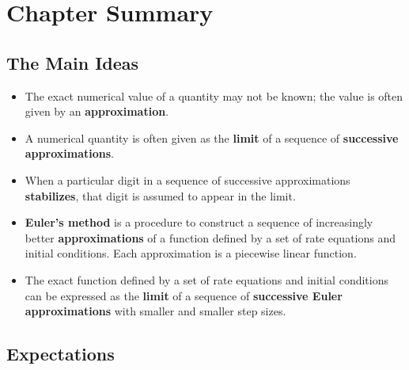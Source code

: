 \section{Chapter Summary}
\label{sec:chapter-summary}

\subsection{The Main Ideas}
\label{subsec:the-main-ideas}

\begin{itemize}

\item The exact numerical value of a quantity may not be known; the
 value is often given by an {\bf approximation}.

\item A numerical quantity is often given as the {\bf limit} of a
 sequence of {\bf successive approximations}.

\item When a particular digit in a sequence of successive
 approximations {\bf stabilizes}, that digit is assumed to appear in
 the limit.

\item {\bf Euler's method} is a procedure to construct a sequence of
 increasingly better {\bf approximations} of a function defined by a
 set of rate equations and initial conditions.  Each approximation is
 a piecewise linear function.

\item The exact function defined by a set of rate equations and
 initial conditions can be expressed as the {\bf limit} of a sequence
 of {\bf successive Euler approximations} with smaller and smaller
 step sizes.

\end{itemize}

\subsection{Expectations}
\label{subsec:expectations}

